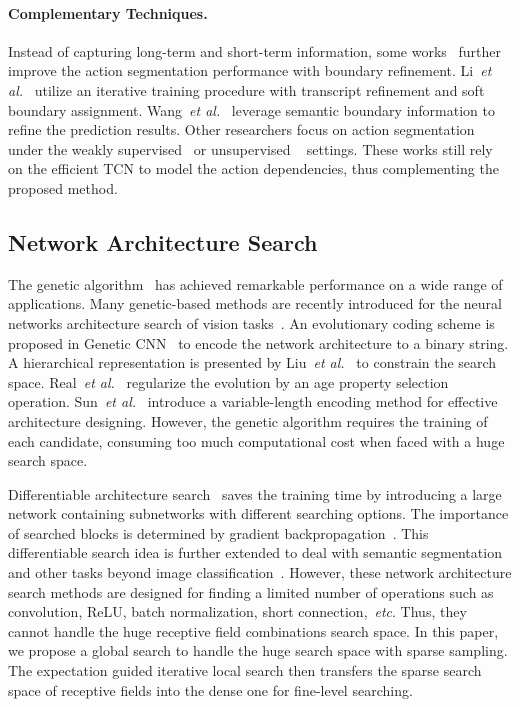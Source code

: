 \documentclass[final]{cvpr}
\newcommand{\myPara}[1]{\vspace{-.12in}\paragraph{#1}}
\def\etc{\emph{etc}}
\def\etal{{\em et al.}}
\begin{document}
\myPara{Complementary Techniques.}
Instead of capturing long-term and short-term information, 
some works~\cite{ding2018weakly,wangboundary} further improve the 
action segmentation performance with boundary refinement. 
Li~\etal~\cite{ding2018weakly} utilize an iterative training procedure 
with transcript refinement and soft boundary assignment.
Wang~\etal~\cite{wangboundary} leverage semantic boundary information 
to refine the prediction results.
Other researchers focus on action segmentation under the 
weakly supervised~\cite{kuehne2017weakly,richard2017weakly,ding2018weakly} 
or unsupervised ~\cite{sener2018unsupervised} settings.
These works still rely on the efficient TCN to model the action dependencies, 
thus complementing the proposed method.


\subsection{Network Architecture Search}

The genetic algorithm~\cite{mitchell1998introduction} has achieved remarkable 
performance on a wide range of applications.
Many genetic-based methods are recently introduced for the 
neural networks architecture search of vision tasks~\cite{real2019regularized,liu2017hierarchical,xie2017genetic,sun2020automatically,lu2019nsga}.
An evolutionary coding scheme is proposed in Genetic CNN~\cite{xie2017genetic}
to encode the network architecture to a binary string. 
A hierarchical representation is presented by Liu~\etal~\cite{liu2017hierarchical} 
to constrain the search space.
Real~\etal~\cite{real2019regularized} regularize the evolution by an 
age property selection operation.
Sun~\etal~\cite{sun2020automatically} introduce a variable-length 
encoding method for effective architecture designing.
However, the genetic algorithm requires the training of each candidate, 
consuming too much computational cost when faced with a huge search space.


Differentiable architecture search~\cite{liu2019darts} saves the training time 
by introducing a large network containing subnetworks 
with different searching options. 
The importance of searched blocks is 
determined by gradient backpropagation~\cite{rumelhart1986learning}.
This differentiable search idea is further extended \cite{zela2020understanding}
to deal with semantic segmentation \cite{liu2019auto} and 
other tasks  beyond image classification~\cite{cai2018proxylessnas}.
However, these network architecture search methods are designed for finding 
a limited number of operations such as convolution, ReLU, 
batch normalization, short connection,~\etc.
Thus, they cannot handle the huge receptive field combinations 
search space.
In this paper, 
we propose a global search to handle the huge search space with sparse sampling.
The expectation guided iterative local search then transfers the sparse search space of 
receptive fields into the dense one for fine-level searching.
\end{document}
